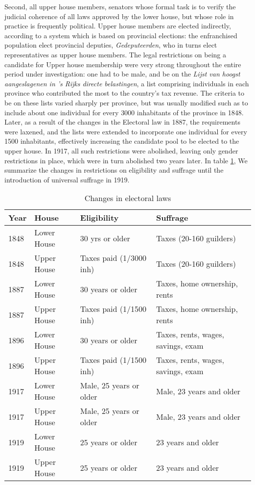 Second, all upper house members, senators whose formal task is to verify the judicial coherence of all laws approved by the lower house, but whose role in practice is frequently political. Upper house members are elected indirectly, according to a system which is based on provincial elections: the enfranchised population elect provincial deputies, \textit{Gedeputeerden}, who in turns elect representatives as upper house members. The legal restrictions on being a candidate for Upper house membership were very strong throughout the entire period under investigation: one had to be male, and be on the \textit{Lijst van hoogst aangeslagenen in 's Rijks directe belastingen}, a list comprising individuals in each province who contributed the most to the country's tax revenue. The criteria to be on these lists varied sharply per province, but was usually modified such as to include about one individual for every 3000 inhabitants of the province in 1848. Later, as a result of the changes in the Electoral law in 1887, the requirements were laxened, and the lists were extended to incorporate one individual for every 1500 inhabitants, effectively increasing the candidate pool to be elected to the upper house. In 1917, all such restrictions were abolished, leaving only gender restrictions in place, which were in turn abolished two years later. In table \ref{tab:upperhouselowerhouse}, We summarize the changes in restrictions on eligibility and suffrage until the introduction of universal suffrage in 1919. 

\begin{table}[!ht]
    \footnotesize
    \centering
    \begin{tabular}{llll}
        Year & House & Eligibility & Suffrage  \\ \hline
        1848 & Lower House & 30 yrs or older & Taxes (20-160 guilders) \\
        1848 & Upper House & Taxes paid (1/3000 inh) & Taxes (20-160 guilders) \\
        1887 & Lower House & 30 years or older & Taxes, home ownership, rents \\
        1887 & Upper House & Taxes paid (1/1500 inh) & Taxes, home ownership, rents \\
        1896 & Lower House & 30 years or older & Taxes, rents, wages, savings, exam \\
        1896 & Upper House & Taxes paid (1/1500 inh) & Taxes, rents, wages, savings, exam \\
        1917 & Lower House & Male, 25 years or older & Male, 23 years and older \\
        1917 & Upper House & Male, 25 years or older  & Male, 23 years and older \\
        1919 & Lower House & 25 years or older & 23 years and older \\
        1919 & Upper House & 25 years or older & 23 years and older \\ \hline
    \end{tabular}
    \caption{Changes in electoral laws}
    \label{tab:upperhouselowerhouse}
\end{table}

